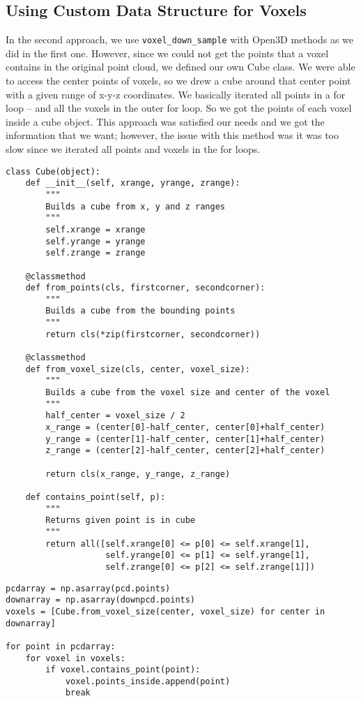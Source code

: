 \documentclass[a4paper]{article}
\begin{document}
\subsection{Using Custom Data Structure for Voxels}
In the second approach, we use \texttt{voxel\_down\_sample} with Open3D\cite{Zhou2018} methods as we did in the first one. However, since we could not get the points that a voxel contains in the original point cloud, we defined our own Cube class. We were able to access the center points of voxels, so we drew a cube around that center point with a given range of x-y-z coordinates. We basically iterated all points in a for loop – and all the voxels in the outer for loop. So we got the points of each voxel inside a cube object. This approach was satisfied our needs and we got the information that we want; however, the issue with this method was it was too slow since we iterated all points and voxels in the for loops. 

\begin{lstlisting}[caption={Our initial custom voxel-like data structure named \texttt{Cube}.}]
class Cube(object):
    def __init__(self, xrange, yrange, zrange):
        """
        Builds a cube from x, y and z ranges
        """
        self.xrange = xrange
        self.yrange = yrange
        self.zrange = zrange

    @classmethod
    def from_points(cls, firstcorner, secondcorner):
        """
        Builds a cube from the bounding points
        """
        return cls(*zip(firstcorner, secondcorner))

    @classmethod
    def from_voxel_size(cls, center, voxel_size):
        """
        Builds a cube from the voxel size and center of the voxel
        """
        half_center = voxel_size / 2
        x_range = (center[0]-half_center, center[0]+half_center)
        y_range = (center[1]-half_center, center[1]+half_center)
        z_range = (center[2]-half_center, center[2]+half_center)
        
        return cls(x_range, y_range, z_range)

    def contains_point(self, p):
        """
        Returns given point is in cube
        """
        return all([self.xrange[0] <= p[0] <= self.xrange[1],
                    self.yrange[0] <= p[1] <= self.yrange[1],
                    self.zrange[0] <= p[2] <= self.zrange[1]])
\end{lstlisting}

\begin{lstlisting}[caption={Splitting our data into voxels using our \texttt{Cube} structure.}]
pcdarray = np.asarray(pcd.points)
downarray = np.asarray(downpcd.points)
voxels = [Cube.from_voxel_size(center, voxel_size) for center in downarray]

for point in pcdarray:
    for voxel in voxels:
        if voxel.contains_point(point):
            voxel.points_inside.append(point)
            break
\end{lstlisting}
\end{document}
